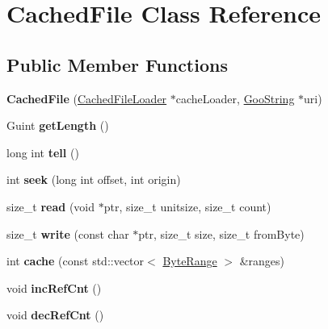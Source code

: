 \hypertarget{class_cached_file}{}\section{Cached\+File Class Reference}
\label{class_cached_file}
\subsection*{Public Member Functions}
\begin{DoxyCompactItemize}
\item 
\mbox{\label{class_cached_file_ad6658d17672036a2d51af7e73a1f19d0}} 
{\bfseries Cached\+File} (\hyperlink{class_cached_file_loader}{Cached\+File\+Loader} $\ast$cache\+Loader, \hyperlink{class_goo_string}{Goo\+String} $\ast$uri)
\item 
\mbox{\label{class_cached_file_a7496b1090112bdc58b42a08bc483d0c8}} 
Guint {\bfseries get\+Length} ()
\item 
\mbox{\label{class_cached_file_ae0251beb55cefb398c829cf6e76fe3c6}} 
long int {\bfseries tell} ()
\item 
\mbox{\label{class_cached_file_a48c1215bb9cefd0c2c18e32b01329a36}} 
int {\bfseries seek} (long int offset, int origin)
\item 
\mbox{\label{class_cached_file_a7715e060eef6b8232c0b974575500092}} 
size\+\_\+t {\bfseries read} (void $\ast$ptr, size\+\_\+t unitsize, size\+\_\+t count)
\item 
\mbox{\label{class_cached_file_a1d5995206b55fc5098e98bd9be0e73dd}} 
size\+\_\+t {\bfseries write} (const char $\ast$ptr, size\+\_\+t size, size\+\_\+t from\+Byte)
\item 
\mbox{\label{class_cached_file_a0d736608af8ba67236dd8ae7a979b512}} 
int {\bfseries cache} (const std\+::vector$<$ \hyperlink{struct___byte_range}{Byte\+Range} $>$ \&ranges)
\item 
\mbox{\label{class_cached_file_af2c29a6ce4aeed8bac5b6242da8564a1}} 
void {\bfseries inc\+Ref\+Cnt} ()
\item 
\mbox{\label{class_cached_file_aadcceaff2e74def72dcf755fed636373}} 
void {\bfseries dec\+Ref\+Cnt} ()
\end{DoxyCompactItemize}
